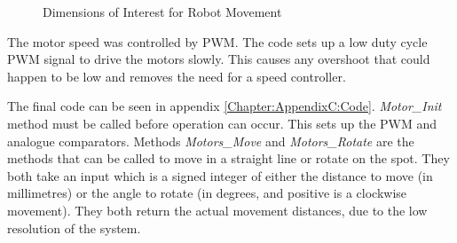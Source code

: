 \begin{figure}
\centering
{}
\caption{Dimensions of Interest for Robot Movement}
\label{fig:RobotBase_Annotated}
\end{figure}

The motor speed was controlled by PWM. The code sets up a low duty cycle PWM signal to drive the motors slowly. This causes any overshoot that could happen to be low and removes the need for a speed controller. 

The final code can be seen in appendix \ref{Chapter:AppendixC:Code}. \textit{Motor\_Init} method must be called before operation can occur. This sets up the PWM and analogue comparators. Methods \textit{Motors\_Move} and \textit{Motors\_Rotate} are the methods that can be called to move in a straight line or rotate on the spot. They both take an input which is a signed integer of either the distance to move (in millimetres) or the angle to rotate (in degrees, and positive is a clockwise movement). They both return the actual movement distances, due to the low resolution of the system.


